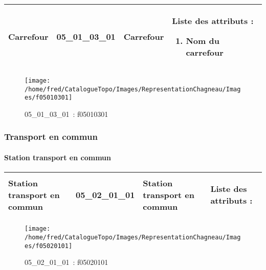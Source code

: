 \documentclass[12pt,titlepage]{book}
\begin{document}
\renewcommand{\arraystretch}{1.2}
\begin{supertabular}{|p{10cm}|c|p{13cm}|p{12cm}|}
 Carrefour & 05\_01\_03\_01 & Carrefour & Liste des attributs :
\begin{enumerate}
  \item Nom du carrefour\end{enumerate}
\\
\hline
\end{supertabular}
\begin{figure}[h!]
  \hfill         %
  \begin{minipage}[t]{3cm}
    \begin{center}
      \texttt{[image: /home/fred/CatalogueTopo/Images/RepresentationChagneau/Images/f05010301]}
      \caption[~05\_01\_03\_01]{\small{05\_01\_03\_01~:} \tiny{f05010301}}\label{f05010301}
    \end{center}
  \end{minipage}
\end{figure}

\subsubsection{\large Transport en commun}
\paragraph{Station transport en commun}
\noindent
\vspace{\baselineskip}

\renewcommand{\arraystretch}{1.2}
\begin{supertabular}{|p{10cm}|c|p{13cm}|p{12cm}|}
 Station transport en commun & 05\_02\_01\_01 & Station transport en commun & Liste des attributs :
\begin{enumerate}
\end{enumerate}
\\
\hline
\end{supertabular}
\begin{figure}[h!]
  \hfill         %
  \begin{minipage}[t]{3cm}
    \begin{center}
      \texttt{[image: /home/fred/CatalogueTopo/Images/RepresentationChagneau/Images/f05020101]}
      \caption[~05\_02\_01\_01]{\small{05\_02\_01\_01~:} \tiny{f05020101}}\label{f05020101}
    \end{center}
  \end{minipage}
\end{figure}
\end{document}
